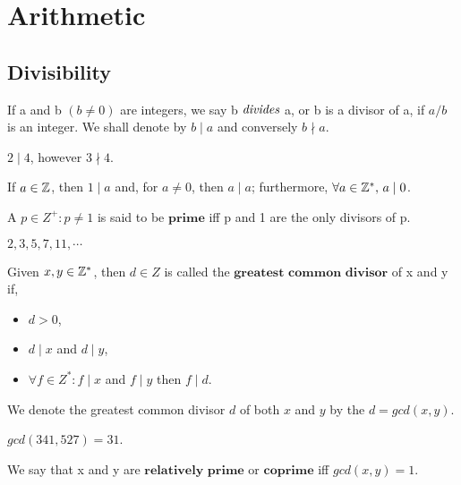 \section{Arithmetic} %
\label{sec:arithmetic}

\subsection{Divisibility}
If a and b $(b \neq 0)$ are integers, we say b $\emph{divides}$ a, or b is a divisor of a,
if $a/b$ is an integer. We shall denote by $b \mid a$ and conversely $b \nmid a$.

\begin{exmp}
 $2 \mid 4$, however $3 \nmid 4$.
\end{exmp}

\begin{exmp}
 If $a \in \mathbb{Z}$, then $1 \mid a$ and, for $a \neq 0$, then $a \mid a$; furthermore, $\forall a \in \mathbb{Z}^*, \, a \mid 0$.
\end{exmp}

\begin{defn}
 A $p \in Z^+ : p \neq 1$ is said to be $\textbf{prime}$ iff
 p and 1 are the only divisors of p.
\end{defn}

\begin{exmp}
 $2, 3, 5, 7, 11, \cdots$
\end{exmp}

\begin{defn}
 Given $x, y \in \mathbb{Z}^*$, then $d \in Z$ is called the $\textbf{greatest common divisor}$ of x and y if,
 \begin{itemize}
  \item $d > 0$,
  \item $d \mid x$ and $d \mid y$,
  \item $\forall f \in Z^* : f \mid x$ and $f \mid y$ then $f \mid d$.
 \end{itemize}
\end{defn}
We denote the greatest common divisor $d$ of both $x$ and $y$ by the $d = gcd(x,y)$.

\begin{exmp}
 $gcd(341,527) = 31$.
\end{exmp}

\begin{defn}
 We say that x and y are $\textbf{relatively prime}$ or $\textbf{coprime}$ iff
 $gcd(x,y) = 1$.
\end{defn}

